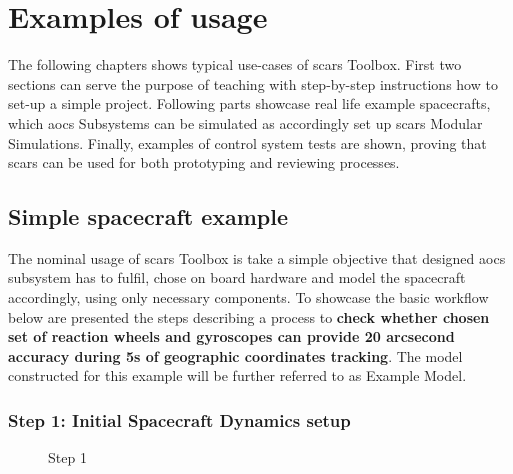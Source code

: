 \section{Examples of usage}\label{sec:examples}
    The following chapters shows typical use-cases of \ac{scars} Toolbox. First two sections can serve the purpose of teaching with step-by-step instructions how to set-up a simple project. Following parts showcase real life example spacecrafts, which \ac{aocs} Subsystems can be simulated as accordingly set up \ac{scars} Modular Simulations. Finally, examples of control system tests are shown, proving that \ac{scars} can be used for both prototyping and reviewing processes.


    \subsection{Simple spacecraft example}\label{sec:simple_spacecraft}
        The nominal usage of \ac{scars} Toolbox is take a simple objective that designed \ac{aocs} subsystem has to fulfil, chose on board hardware and model the spacecraft accordingly, using only necessary components. To showcase the basic workflow below are presented the steps describing a process to \textbf{check whether chosen set of reaction wheels and gyroscopes can provide 20 arcsecond accuracy during 5s of geographic coordinates tracking}. The model constructed for this example will be further referred to as Example Model. 

        \subsubsection*{Step 1: Initial Spacecraft Dynamics setup}
            \begin{figure}[H]
                \centering
                \qquad
                \caption{Step 1}%
                \label{fig:step1}%
            \end{figure}


